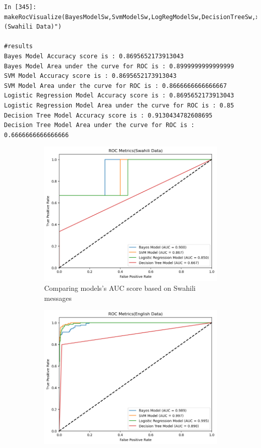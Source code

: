 \documentclass[12pt,a4paper, oneside]{book}
\begin{document}
\begin{lstlisting}[style=stylejupyter]
In [345]: makeRocVisualize(BayesModelSw,SvmModelSw,LogRegModelSw,DecisionTreeSw,x_test_features_sw,y_test_sw,"(Swahili Data)")

#results 
Bayes Model Accuracy score is : 0.8695652173913043
Bayes Model Area under the curve for ROC is : 0.8999999999999999
SVM Model Accuracy score is : 0.8695652173913043
SVM Model Area under the curve for ROC is : 0.8666666666666667
Logistic Regression Model Accuracy score is : 0.8695652173913043
Logistic Regression Model Area under the curve for ROC is : 0.85
Decision Tree Model Accuracy score is : 0.9130434782608695
Decision Tree Model Area under the curve for ROC is : 0.6666666666666666 
\end{lstlisting}  
\begin{figure}[h]
\begin{subfigure}{7.5cm}
	\includegraphics[width=1\linewidth]{CollectImages/rocSwahili}
	\caption{Comparing models's AUC score based on Swahili messages}
	\label{fig:rocswahili}
\end{subfigure}
 \begin{subfigure}{7.5cm}
	\includegraphics[width=1\linewidth]{CollectImages/rocEnglish}

\end{subfigure}
\end{figure}
\end{document}
